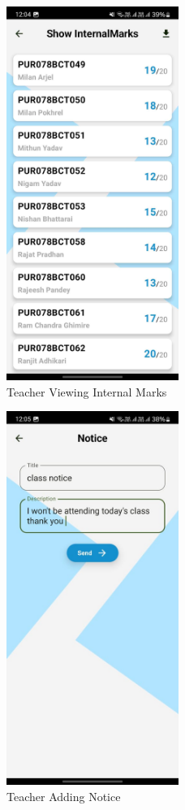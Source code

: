 \begin{figure}[H]
    \centering
    \includegraphics[width=0.5\textwidth]{Graphics/output/teacher_show_marks.jpg}
    \caption{Teacher Viewing Internal Marks}
    \label{fig:teacher_show_marks}
\end{figure}

\begin{figure}[H]
    \centering
    \includegraphics[width=0.5\textwidth]{Graphics/output/teacher_add_notice.jpg}
    \caption{Teacher Adding Notice}
    \label{fig:teacher_add_notice}
\end{figure}

